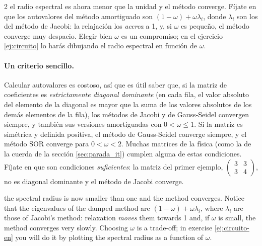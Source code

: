 \begin{paracol}{2}
el radio espectral es ahora menor que la unidad y el método converge. Fíjate en que los autovalores del método amortiguado son $(1-\omega)+\omega\lambda_i$, donde $\lambda_i$ son los del método de Jacobi: la relajación los \emph{acerca} a 1, y, si $\omega$ es pequeño, el método converge muy despacio. Elegir bien $\omega$ es un compromiso; en el ejercicio \ref{ej:circuito} lo harás dibujando el radio espectral en función de $\omega$.

\paragraph{Un criterio sencillo.} Calcular autovalores es costoso, así que es útil saber que, si la matriz de coeficientes es \emph{estrictamente diagonal dominante} (en cada fila, el valor absoluto del elemento de la diagonal es mayor que la suma de los valores absolutos de los demás elementos de la fila), los métodos de Jacobi y de Gauss-Seidel convergen siempre, y también sus versiones amortiguadas con $0<\omega\leq1$. Si la matriz es simétrica y definida positiva, el método de Gauss-Seidel converge siempre, y el método SOR converge para $0<\omega<2$. Muchas matrices de la física (como la de la cuerda de la sección \ref{sec:parada_it}) cumplen alguna de estas condiciones. Fíjate en que son condiciones \emph{suficientes}: la matriz del primer ejemplo, $\left(\begin{smallmatrix}3&3\\3&4\end{smallmatrix}\right)$, no es diagonal dominante y el método de Jacobi converge.

\switchcolumn
the spectral radius is now smaller than one and the method converges. Notice that the eigenvalues of the damped method are $(1-\omega)+\omega\lambda_i$, where $\lambda_i$ are those of Jacobi's method: relaxation \emph{moves} them towards 1 and, if $\omega$ is small, the method converges very slowly. Choosing $\omega$ is a trade-off; in exercise \ref{ej:circuito-en} you will do it by plotting the spectral radius as a function of $\omega$.


\end{paracol}
